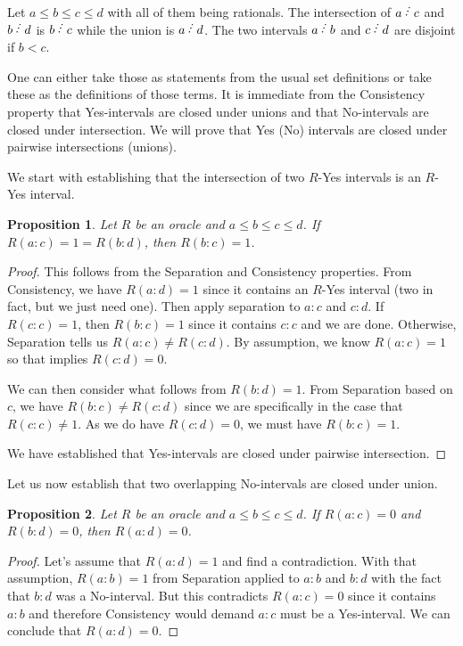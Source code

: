 \documentclass[12pt]{article}
\newtheorem{proposition}{Proposition}[subsection]
\begin{document}
Let $a \leq b \leq c \leq d$ with all of them being rationals. The intersection of $a\lte c$ and $b\lte d$ is $b\lte c$ while the union is $a\lte d$. The two intervals $a\lte b$ and $c\lte d$ are disjoint if $b < c$. 

One can either take those as statements from the usual set definitions or take these as the definitions of those terms. It is immediate from the Consistency property that Yes-intervals are closed under unions and that No-intervals are closed under intersection. We will prove that Yes (No) intervals are closed under pairwise intersections (unions). 

We start with establishing that the intersection of two $R$-Yes intervals is an $R$-Yes interval.

\begin{proposition}\label{pr:inter}
Let $R$ be an oracle and $a \leq b \leq c \leq d$. If $R(a:c) = 1 = R(b:d)$, then $R(b:c) = 1$.
\end{proposition}

\begin{proof}
  
  This follows from the Separation and Consistency properties. From Consistency, we have $R(a:d) = 1$ since it contains an $R$-Yes interval (two in fact, but we just need one). Then apply separation to $a:c$ and $c:d$. If $R(c:c) = 1$, then $R(b:c) = 1$ since it contains $c:c$ and we are done. Otherwise, Separation tells us $R(a:c) \neq R(c:d)$. By assumption, we know $R(a:c) = 1$ so that implies $R(c:d) = 0$. 
  
  We can then consider what follows from $R(b:d) = 1$.  From Separation based on $c$, we have $R(b:c) \neq R(c:d)$ since we are specifically in the case that $R(c:c) \neq 1$. As we do have $R(c:d) = 0$, we must have $R(b:c) = 1$.
  
  We have established that Yes-intervals are closed under pairwise intersection. 
\end{proof}


Let us now establish that two overlapping No-intervals are closed under union. 

\begin{proposition}\label{pr:union}
Let $R$ be an oracle and $a \leq b \leq c \leq d$.  If $R(a:c) = 0$ and $R(b:d) = 0$, then $R(a:d) = 0$. 
\end{proposition}

\begin{proof}
    Let's assume that $R(a:d) = 1$ and find a contradiction. With that assumption, $R(a:b) = 1$ from Separation applied to $a:b$ and $b:d$ with the fact that $b:d$ was a No-interval. But this contradicts $R(a:c)= 0$ since it contains $a:b$ and therefore Consistency would demand $a:c$ must be a Yes-interval. We can conclude that $R(a:d) =0$.
\end{proof}
\end{document}
